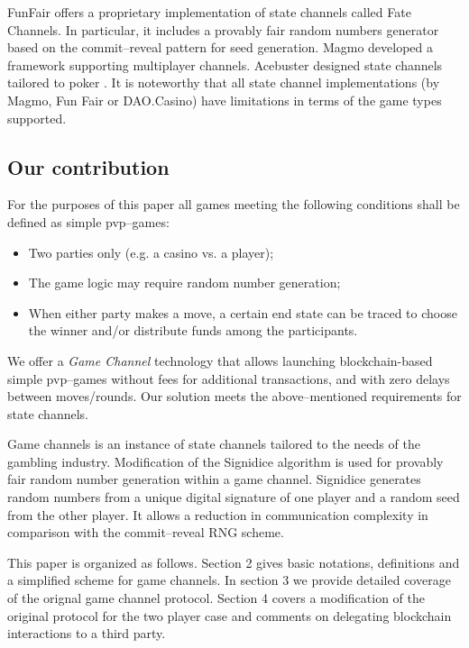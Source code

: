 	FunFair \cite{bib15} offers a proprietary implementation of state channels called Fate Channels. In particular, it includes a provably fair random numbers generator based on the commit--reveal pattern for seed generation. Magmo \cite{bib16} developed a framework supporting multiplayer channels. Acebuster designed state channels tailored to poker \cite{bib17}. It is noteworthy that all state channel implementations (by Magmo, Fun Fair or DAO.Casino) have limitations in terms of the game types supported.

		\subsection {Our contribution}
	For the purposes of this paper all games meeting the following conditions shall be defined as simple pvp--games:
	\begin{itemize}
		\item Two parties only (e.g. a casino vs. a player);
		\item The game logic may require random number generation;
		\item When either party makes a move, a certain end state can be traced to choose the winner and/or distribute funds among the participants.
	\end{itemize}
	We offer a \textit {Game Channel} technology that allows launching blockchain-based simple pvp--games without fees for additional transactions, and with zero delays between moves/rounds. Our solution meets the above--mentioned requirements for state channels.

	Game channels is an instance of state channels tailored to the needs of the gambling industry. Modification of the Signidice \cite{bib18} algorithm is used for provably fair random number generation within a game channel. Signidice generates random numbers from a unique digital signature of one player and a random seed from the other player. It allows a reduction in communication complexity in comparison with the commit--reveal RNG scheme. 

This paper is organized as follows. Section 2 gives basic notations, definitions and a simplified scheme for game channels. In section 3 we provide detailed coverage of the orignal game channel protocol. Section 4 covers a modification of the original protocol for the two player case and comments on delegating blockchain interactions to a third party.
